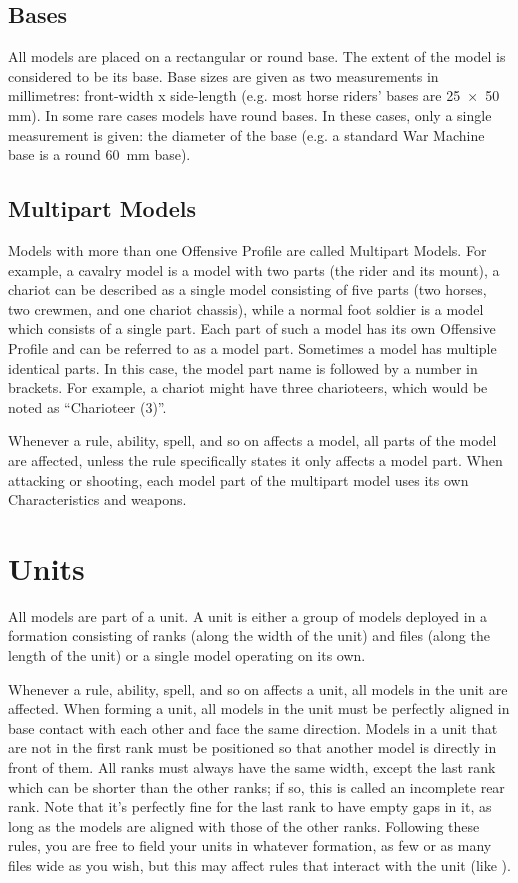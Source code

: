 \subsection{Bases}
\label{bases}

All models are placed on a rectangular or round base. The extent of the model is considered to be its base. Base sizes are given as two measurements in millimetres: front-width x side-length (e.g. most horse riders' bases are \num{25x50} \si{\milli\meter}). In some rare cases models have round bases. In these cases, only a single measurement is given: the diameter of the base (e.g. a standard War Machine base is a round \SI{60}{\milli\meter} base).

\subsection{Multipart Models}
\label{multipart_models}

Models with more than one Offensive Profile are called Multipart Models. For example, a cavalry model is a model with two parts (the rider and its mount), a chariot can be described as a single model consisting of five parts (two horses, two crewmen, and one chariot chassis), while a normal foot soldier is a model which consists of a single part. Each part of such a model has its own Offensive Profile and can be referred to as a model part. Sometimes a model has multiple identical parts. In this case, the model part name is followed by a number in brackets. For example, a chariot might have three charioteers, which would be noted as \enquote{Charioteer (3)}.

Whenever a rule, ability, spell, and so on affects a model, all parts of the model are affected, unless the rule specifically states it only affects a model part. When attacking or shooting, each model part of the multipart model uses its own Characteristics and weapons.

\section{Units}
\label{units}

All models are part of a unit. A unit is either a group of models deployed in a formation consisting of ranks (along the width of the unit) and files (along the length of the unit) or a single model operating on its own.

Whenever a rule, ability, spell, and so on affects a unit, all models in the unit are affected. When forming a unit, all models in the unit must be perfectly aligned in base contact with each other and face the same direction. Models in a unit that are not in the first rank must be positioned so that another model is directly in front of them. All ranks must always have the same width, except the last rank which can be shorter than the other ranks; if so, this is called an incomplete rear rank. Note that it's perfectly fine for the last rank to have empty gaps in it, as long as the models are aligned with those of the other ranks. Following these rules, you are free to field your units in whatever formation, as few or as many files wide as you wish, but this may affect rules that interact with the unit (like ).

